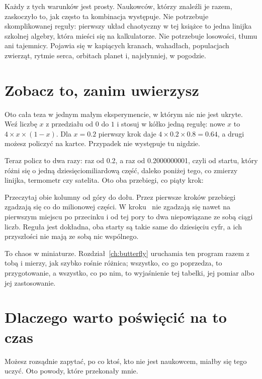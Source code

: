 Każdy z tych warunków jest prosty. Naukowców, którzy znaleźli je razem,
zaskoczyło to, jak często ta kombinacja występuje. Nie potrzebuje
skomplikowanej reguły: pierwszy układ chaotyczny w tej książce to jedna
linijka szkolnej algebry, która mieści się na kalkulatorze. Nie potrzebuje
losowości, tłumu ani tajemnicy. Pojawia się w kapiących kranach, wahadłach,
populacjach zwierząt, rytmie serca, orbitach planet i, najsłynniej, w
pogodzie.

\section*{Zobacz to, zanim uwierzysz}

Oto cała teza w jednym małym eksperymencie, w którym nic nie jest ukryte.
Weź liczbę $x$ z przedziału od $0$ do $1$ i stosuj w kółko jedną regułę:
nowe $x$ to $4 \times x \times (1 - x)$. Dla $x = \num{0.2}$ pierwszy krok
daje $4 \times \num{0.2} \times \num{0.8} = \num{0.64}$, a drugi możesz
policzyć na kartce. Przypadek nie występuje tu nigdzie.

Teraz policz to dwa razy: raz od \num{0.2}, a raz od \num{0.2000000001}, czyli
od startu, który różni się o jedną dziesięciomiliardową część, daleko poniżej
tego, co zmierzy linijka, termometr czy satelita. Oto oba przebiegi, co piąty
krok:


\noindent
Przeczytaj obie kolumny od góry do dołu. Przez pierwsze
 kroków przebiegi zgadzają się co do milionowej
części. W kroku~ nie zgadzają się nawet na pierwszym
miejscu po przecinku i od tej pory to dwa niepowiązane ze sobą ciągi liczb.
Reguła jest dokładna, oba starty są takie same do dziesięciu cyfr, a ich
przyszłości nie mają ze sobą nic wspólnego.

To chaos w miniaturze. Rozdział~\ref{ch:butterfly} uruchamia ten program razem
z tobą i mierzy, jak szybko rośnie różnica; wszystko, co go poprzedza, to
przygotowanie, a wszystko, co po nim, to wyjaśnienie tej tabelki, jej pomiar
albo jej zastosowanie.

\section*{Dlaczego warto poświęcić na to czas}

Możesz rozsądnie zapytać, po co ktoś, kto nie jest naukowcem, miałby się
tego uczyć. Oto powody, które przekonały mnie.

